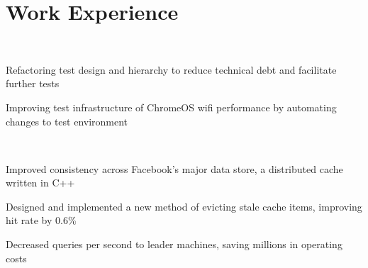 \documentclass[]{resume-style}
\begin{document}
\vspace{-1mm}

\section{\hfill Work Experience \hfill}

 \\
\vspace{0.5mm}
\begin{tightemize}
\vspace{-0.1mm}
\item Refactoring test design and hierarchy to reduce technical debt and facilitate further tests
\item Improving test infrastructure of ChromeOS wifi performance by automating changes to test environment
\end{tightemize}
\vspace{2mm}
\vspace{0.25mm}
 \\
\vspace{2mm}
\begin{tightemize}
\vspace{-1.0mm}
\item Improved consistency across Facebook's major data store, a distributed cache written in C++
\item Designed and implemented a new method of evicting stale cache items, improving hit rate by 0.6\%
\item Decreased queries per second to leader machines, saving millions in operating costs
\end{tightemize}
\end{document}
